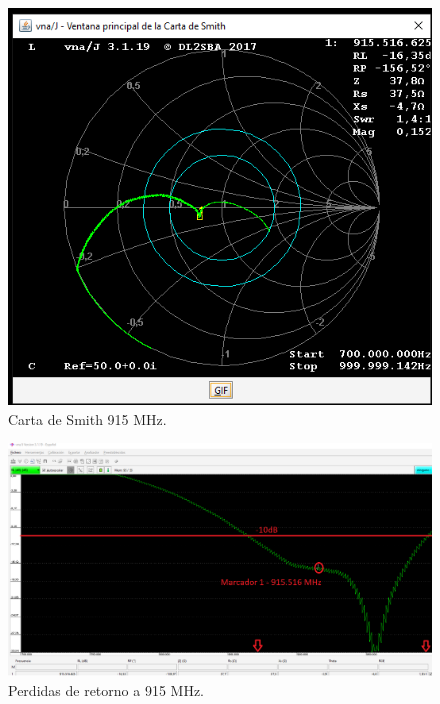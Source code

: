 \begin{figure}[H]
	\centering
	\includegraphics[scale=.7]{./Figures/tunnigsigfoxchart.png}
	\caption{Carta de Smith 915 MHz.}
	\label{fig:tunnigsigfoxchart}
\end{figure}

\begin{figure}[H]
	\centering
	\includegraphics[scale=.35]{./Figures/tunnigsigfox5.png}
	\caption{Perdidas de retorno a 915 MHz.}
	\label{fig:tunnigsigfox5}
\end{figure}





